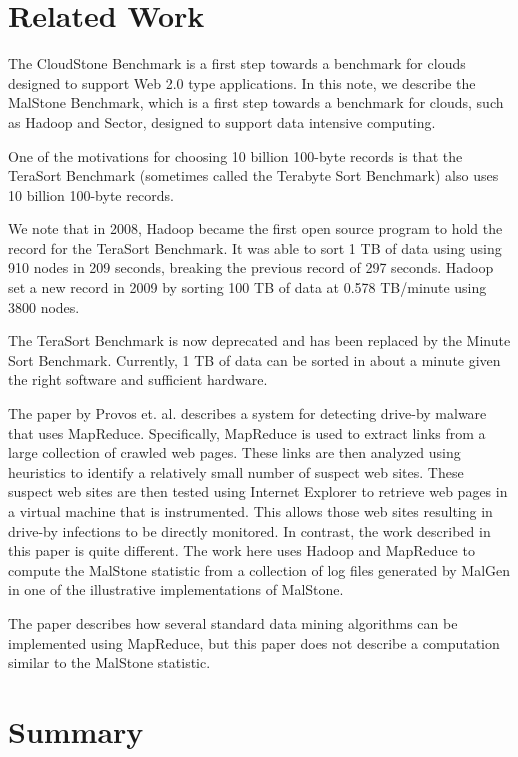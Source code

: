 \documentclass{acm_proc_article-sp}
\def\malstone{MalStone } \def\malgen{MalGen }
\def\malstonens{MalStone} \def\malgenns{MalGen}
\begin{document}
\section{Related Work}


The CloudStone Benchmark \cite{Sobel:2008} is a first step towards a
benchmark for clouds designed to support Web 2.0 type applications. In
this note, we describe the \malstone Benchmark, which is a first step
towards a benchmark for clouds, such as Hadoop and Sector, designed to
support data intensive computing.

One of the motivations for choosing 10 billion 100-byte records is
that the TeraSort Benchmark \cite{Gray:TeraSort} (sometimes called the
Terabyte Sort Benchmark) also uses 10 billion 100-byte records.

We note that in 2008, Hadoop became the first open source program to hold the
record for the TeraSort Benchmark. It was able to sort 1 TB of data
using using 910 nodes in 209 seconds, breaking the previous record of
297 seconds.  Hadoop set a new record in 2009 by sorting 100 TB of data
at 0.578 TB/minute using 3800 nodes. 

The TeraSort Benchmark is now deprecated and has been
replaced by the Minute Sort Benchmark. Currently, 1 TB of data can be
sorted in about a minute given the right software and sufficient
hardware.  

The paper by Provos et. al. \cite{Provos:2007} describes a system for
detecting drive-by malware that uses MapReduce.  Specifically,
MapReduce is used to extract links from a large collection of crawled
web pages.  These links are then analyzed using heuristics to identify
a relatively small number of suspect web sites.  These suspect web
sites are then tested using Internet Explorer to retrieve web pages in
a virtual machine that is instrumented.  This allows those web sites
resulting in drive-by infections to be directly monitored.  In
contrast, the work described in this paper is quite different.  The
work here uses Hadoop and MapReduce to compute the \malstone statistic
from a collection of log files generated by \malgen in one of the
illustrative implementations of \malstonens.

The paper \cite{Chu:2007} describes how several standard data mining
algorithms can be implemented using MapReduce, but this paper does not
describe a computation similar to the \malstone statistic.



\section{Summary}
\end{document}
